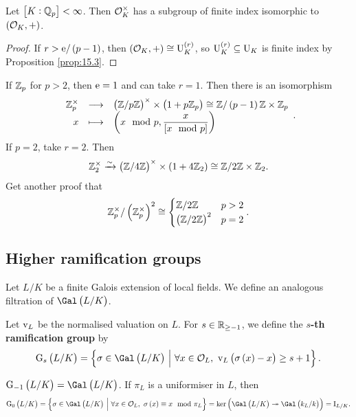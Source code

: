 \pagebreak

\begin{corollary}
Let $ \sbr{K : \QQ_p} < \infty $. Then $ \mathcal{O}_K^\times $ has a subgroup of finite index isomorphic to $ \br{\OOO_K, +} $.
\end{corollary}

\begin{proof}
If $ r > \e / \br{p - 1} $, then $ \br{\OOO_K, +} \cong \U_K^{\br{r}} $, so $ \U_K^{\br{r}} \subseteq \U_K $ is finite index by Proposition \ref{prop:15.3}.
\end{proof}

\begin{example*}
If $ \mathbb{Z}_p $ for $ p > 2 $, then $ \mathrm{e} = 1 $ and can take $ r = 1 $. Then there is an isomorphism
$$ \function{\ZZ_p^\times}{\br{\ZZ / p\ZZ}^\times \times \br{1 + p\ZZ_p} \cong \ZZ / \br{p - 1}\ZZ \times \ZZ_p}{x}{\br{x \mod p, \dfrac{x}{\sbr{x \mod p}}}}. $$
If $ p = 2 $, take $ r = 2 $. Then
$$ \ZZ_2^\times \xrightarrow{\sim} \br{\ZZ / 4\ZZ}^\times \times \br{1 + 4\ZZ_2} \cong \ZZ / 2\ZZ \times \ZZ_2. $$
Get another proof that
$$ \ZZ_p^\times / \br{\ZZ_p^\times}^2 \cong
\begin{cases}
\ZZ / 2\ZZ & p > 2 \\
\br{\ZZ / 2\ZZ}^2 & p = 2
\end{cases}.
$$
\end{example*}

\subsection{Higher ramification groups}

Let $ L / K $ be a finite Galois extension of local fields. We define an analogous filtration of $ \Gal\br{L / K} $.

\begin{definition}
Let $ \mathrm{v}_L $ be the normalised valuation on $ L $. For $ s \in \mathbb{R}_{\ge -1} $, we define the \textbf{$ s $-th ramification group} by
$$ \G_s\br{L / K} = \cbr{\sigma \in \Gal\br{L / K} \st \forall x \in \OOO_L, \ \v_L\br{\sigma\br{x} - x} \ge s + 1}. $$
\end{definition}

\begin{example*}
$ \G_{-1}\br{L / K} = \Gal\br{L / K} $. If $ \pi_L $ is a uniformiser in $ L $, then
$$ \G_0\br{L / K} = \cbr{\sigma \in \Gal\br{L / K} \st \forall x \in \OOO_L, \ \sigma\br{x} \equiv x \mod \pi_L} = \ker \br{\Gal\br{L / K} \twoheadrightarrow \Gal\br{k_L / k}} = \I_{L / K}. $$
\end{example*}

